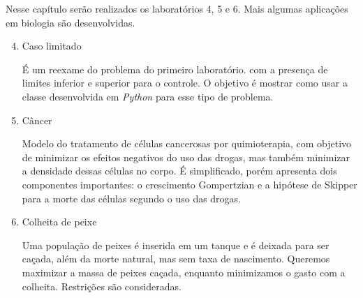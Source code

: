 Nesse capítulo serão realizados os laboratórios 4, 5 e 6. Mais algumas
aplicações em biologia são desenvolvidas.

\begin{enumerate}[label=\textbf{Lab \arabic*:}]
    \setcounter{enumi}{3}

    \item Caso limitado 
    
    É um reexame do problema do primeiro laboratório. com a
    presença de limites inferior e superior para o controle. O objetivo é
    mostrar como usar a classe desenvolvida em \textit{Python} para esse tipo
    de problema.

    \item Câncer
    
    Modelo do tratamento de células cancerosas por quimioterapia, com objetivo
    de minimizar os efeitos negativos do uso das drogas, mas também minimizar
    a densidade dessas células no corpo. É simplificado, porém apresenta dois
    componentes importantes: o crescimento Gompertzian e a hipótese de Skipper
    para a morte das células segundo o uso das drogas. 

    \item Colheita de peixe  
    
    Uma população de peixes é inserida em um tanque e é deixada para ser
    caçada, além da morte natural, mas sem taxa de nascimento. Queremos maximizar
    a massa de peixes caçada, enquanto minimizamos o gasto com a colheita.
    Restrições são consideradas. 
 
\end{enumerate}